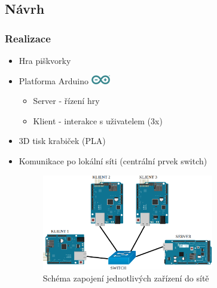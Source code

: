 \documentclass{beamer}
\begin{document}
\subsection{Návrh}
\begin{frame}
\frametitle{Realizace}
 \begin{itemize}
 \item Hra piškvorky
 \item Platforma Arduino \includegraphics[height=0.4cm]{img/Arduino.png}
 	\begin{itemize}
 		\item Server - řízení hry
 		\item Klient - interakce s uživatelem (3x)
 	\end{itemize}
 \item 3D tisk krabiček (PLA)
 \item Komunikace po lokální síti (centrální prvek switch)
 
 \pause
 \begin{figure}
 \centering
 \includegraphics[width=7.5cm]{img/schema_net.png}
 \caption{Schéma zapojení jednotlivých zařízení do sítě}
 \end{figure}
 \end{itemize}
\end{frame}
\end{document}
